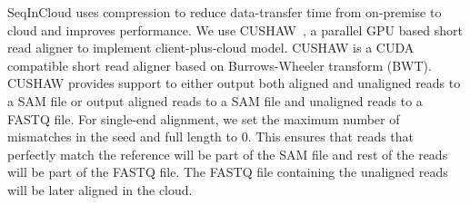 SeqInCloud uses compression to reduce data-transfer time from on-premise to cloud and improves performance. We use CUSHAW~\cite{cushaw}, a parallel GPU based short read aligner to implement client-plus-cloud model. CUSHAW is a CUDA compatible short read aligner based on Burrows-Wheeler transform (BWT). CUSHAW provides support to either output both aligned and unaligned reads to a SAM file or output aligned reads to a SAM file and unaligned reads to a FASTQ file. For single-end alignment, we set the maximum number of mismatches in the seed and full length to 0. This ensures that reads that perfectly match the reference will be part of the SAM file and rest of the reads will be part of the FASTQ file. The FASTQ file containing the unaligned reads will be later aligned in the cloud.



%
%
%

